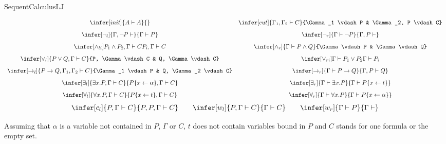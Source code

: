 \begin{entry}{SequentCalculusLJ}  



\begin{calculus}

\[
\begin{array}{cc}
\infer[init]{A \vdash A}{}
&
\infer[cut]{\Gamma_1, \Gamma_2 \vdash C}{\Gamma_1 \vdash P & \Gamma_2, P \vdash C}
\\[8pt]
\infer[\neg_l]{\Gamma, \neg P \vdash }{\Gamma \vdash P}
&
\infer[\neg_r]{\Gamma \vdash \neg P}{\Gamma, P \vdash }
\\[8pt]
\infer[\wedge_{li}]{P_1 \wedge P_2, \Gamma \vdash C}{P_i, \Gamma \vdash C}
&
\infer[\wedge_r]{\Gamma \vdash P \wedge Q}{\Gamma \vdash P & \Gamma \vdash Q}
\\[8pt]
\infer[\vee_l]{P \vee Q, \Gamma \vdash C}{P, \Gamma \vdash C & Q, \Gamma \vdash C}
&
\infer[\vee_{ri}]{\Gamma \vdash P_1 \vee P_2}{\Gamma \vdash P_i}
\\[8pt]
\infer[\rightarrow_l]{P \rightarrow Q, \Gamma_1, \Gamma_2 \vdash C}{\Gamma_1
\vdash P & Q, \Gamma_2 \vdash C}
&
\infer[\rightarrow_r]{\Gamma \vdash P \rightarrow Q}{\Gamma, P \vdash Q}
\\[8pt]
\infer[\exists_l]{\exists x.P, \Gamma \vdash C}{P\{x \leftarrow
\alpha\}, \Gamma \vdash C}
&
\infer[\exists_r]{\Gamma \vdash \exists x.P}{\Gamma \vdash P\{x
\leftarrow t\}}
\\[8pt]
\infer[\forall_l]{\forall x.P, \Gamma \vdash C}{P\{x \leftarrow t\}, \Gamma \vdash C}
&
\infer[\forall_r]{\Gamma \vdash \forall x.P}{\Gamma \vdash P\{x
\leftarrow \alpha \}}
\\
\end{array}
\]
$$
\infer[c_l]{P, \Gamma \vdash C}{P, P, \Gamma \vdash C}
\qquad
\infer[w_l]{P, \Gamma \vdash C}{\Gamma \vdash C}
\qquad
\infer[w_r]{\Gamma \vdash P}{\Gamma \vdash}
$$

\end{calculus}


\begin{clarifications}
Assuming that $\alpha$ is a variable not contained in $P$, $\Gamma$ or $C$,
$t$ does not contain variables bound in $P$ and $C$ stands for
one formula or the empty set.
\end{clarifications}


\end{entry}
